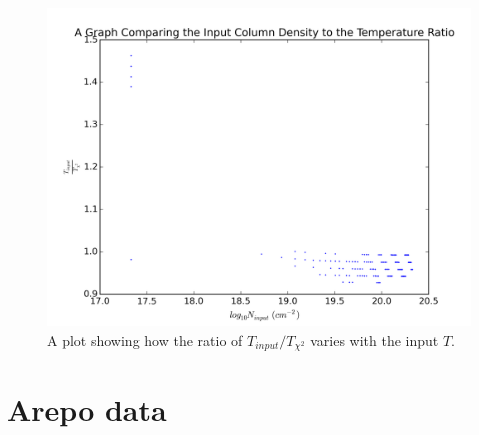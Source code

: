 \documentclass{report}
\begin{document}
\begin{figure}[H]
  \centering
  \includegraphics[width=0.44\linewidth]{../img/sim/T_ratio_inp.png}
  \caption{A plot showing how the ratio of $T_{input}/T_{\chi^{2}}$ varies with the input $T$.}\label{fig:T_ratio}
\end{figure}

\pagebreak
\section{Arepo data} \label{sec:sph}
\end{document}
